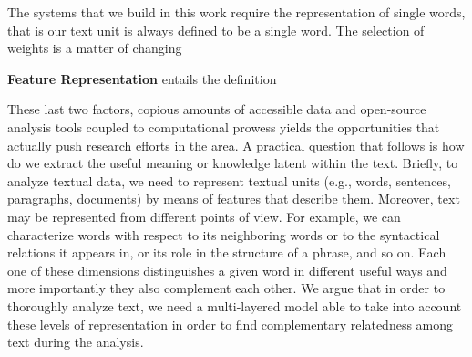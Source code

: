 The systems that we build in this work require the representation of single words, that is our text unit is always defined to be a single word. The selection of weights is a matter of changing 

\textbf{Feature Representation} entails the definition 

%


These last two factors, copious amounts of accessible data and open-source analysis tools coupled to computational prowess yields the opportunities that actually push research efforts in the area.
 A practical question that follows is how do we extract the useful meaning or knowledge latent within the text. 
 Briefly, to analyze textual data, we need to represent textual units (e.g.,  words, sentences, paragraphs, documents)   by means of features that describe them. 
 Moreover, text may be represented from different points of view. For example, we can characterize words with respect to its neighboring words or to the syntactical relations it appears in, or its role in the structure of a phrase, and so on. Each one of these dimensions distinguishes a given word in different useful ways and more importantly they also complement each other. We argue that in order to thoroughly analyze text,  we need a multi-layered model able to take into account these levels of representation in order to find complementary relatedness among  text during the analysis.

